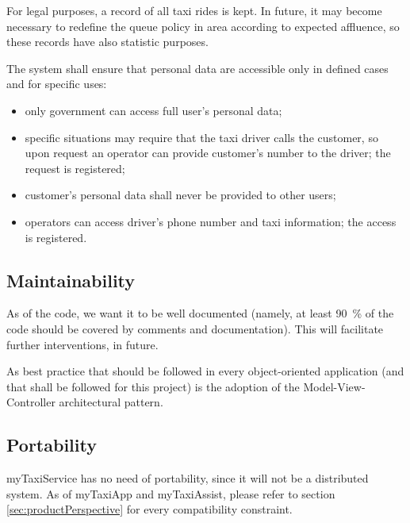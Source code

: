For legal purposes, a record of all taxi rides is kept. In future, it may become necessary to redefine the queue policy in area according to expected affluence, so these records have also statistic purposes.

The system shall ensure that personal data are accessible only in defined cases and for specific uses: 
\begin{itemize}
	
	\item only government can access full user's personal data;
	
	\item specific situations may require that the taxi driver calls the customer, so upon request an operator can provide customer's number to the driver; the request is registered;
	
	\item customer's personal data shall never be provided to other users;
	
	\item operators can access driver's phone number and taxi information; the access is registered.

\end{itemize}


\subsection{Maintainability}
As of the code, we want it to be well documented (namely, at least \SI{90}{\percent} of the code should be covered by comments and documentation). This will facilitate further interventions, in future. 

As best practice that should be followed in every object-oriented application (and that shall be followed for this project) is the adoption of the Model-View-Controller architectural pattern. 


\subsection{Portability}
myTaxiService has no need of portability, since it will not be a distributed system. As of myTaxiApp and myTaxiAssist, please refer to section \ref{sec:productPerspective} for every compatibility constraint.